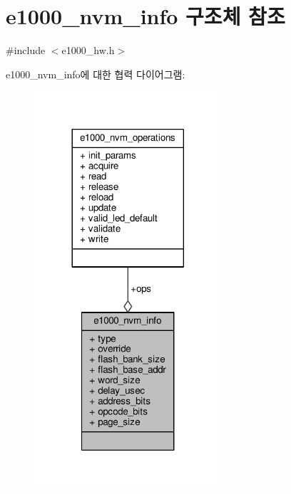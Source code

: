 \hypertarget{structe1000__nvm__info}{}\section{e1000\+\_\+nvm\+\_\+info 구조체 참조}
\label{structe1000__nvm__info}


{\ttfamily \#include $<$e1000\+\_\+hw.\+h$>$}



e1000\+\_\+nvm\+\_\+info에 대한 협력 다이어그램\+:
\nopagebreak
\begin{figure}[H]
\begin{center}
\leavevmode
\includegraphics[width=197pt]{structe1000__nvm__info__coll__graph}
\end{center}
\end{figure}
